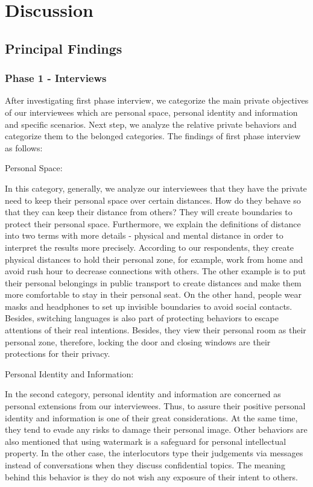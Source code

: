 \section{Discussion}
\label{sec:5}

\subsection{Principal Findings}
\label{Label2}


\subsubsection{Phase 1 - Interviews} 
After investigating first phase interview, we categorize the main private objectives of our interviewees which are personal space, personal identity and information and specific scenarios. Next step, we analyze the relative private behaviors and categorize them to the belonged categories. The findings of first phase interview as follows:  

Personal Space:

In this category, generally, we analyze our interviewees that they have the private need to keep their personal space over certain distances. How do they behave so that they can keep their distance from others? They will create boundaries to protect their personal space. Furthermore, we explain the definitions of distance into two terms with more details - physical and mental distance in order to interpret the results more precisely. According to our respondents, they create physical distances to hold their personal zone, for example, work from home and avoid rush hour to decrease connections with others. The other example is to put their personal belongings in public transport to create distances and make them  more comfortable to stay in their personal seat. On the other hand, people wear masks and headphones to set up invisible boundaries to avoid social contacts. Besides, switching languages is also part of protecting behaviors to escape attentions of their real intentions. Besides, they view their personal room as their personal zone, therefore, locking the door and closing windows are their protections for their privacy. 

Personal Identity and Information:

In the second category, personal identity and information are concerned as personal extensions from our interviewees. Thus, to assure their positive personal identity and information is one of their great considerations. At the same time, they tend to evade any risks to damage their personal image. Other behaviors are also mentioned that using watermark is a safeguard for personal intellectual property. In the other case, the interlocutors type their judgements via messages instead of conversations when they discuss confidential topics. The meaning behind this behavior is they do not wish any exposure of their intent to others. 

